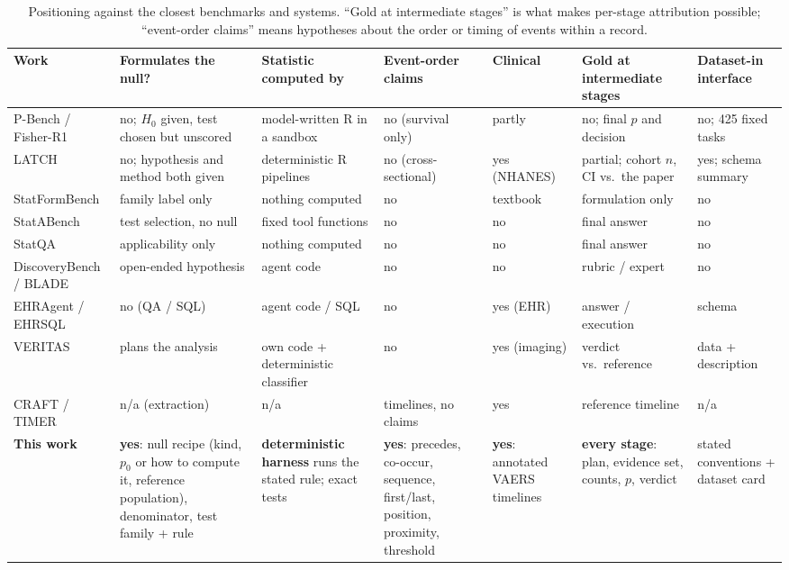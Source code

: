 \begin{table}[t]
\centering
\scriptsize
\setlength{\tabcolsep}{3pt}
\renewcommand{\arraystretch}{1.15}
\begin{tabularx}{\textwidth}{@{}p{2.55cm} Y Y Y Y Y Y@{}}
\toprule
Work & Formulates the null? & Statistic computed by & Event-order claims & Clinical & Gold at intermediate stages & Dataset-in interface \\
\midrule
P-Bench / Fisher-R1 \cite{miao2026fisher} & no; $H_0$ given, test chosen but unscored & model-written R in a sandbox & no (survival only) & partly & no; final $p$ and decision & no; 425 fixed tasks \\
LATCH \cite{gim2026latch} & no; hypothesis and method both given & deterministic R pipelines & no (cross-sectional) & yes (NHANES) & partial; cohort $n$, CI vs.\ the paper & yes; schema summary \\
StatFormBench \cite{wang2026statformbench} & family label only & nothing computed & no & textbook & formulation only & no \\
StatABench \cite{zhu2026statabench} & test selection, no null & fixed tool functions & no & no & final answer & no \\
StatQA \cite{zhu2024statqa} & applicability only & nothing computed & no & no & final answer & no \\
DiscoveryBench / BLADE \cite{majumder2025discoverybench,gu2024blade} & open-ended hypothesis & agent code & no & no & rubric / expert & no \\
EHRAgent / EHRSQL \cite{shi2024ehragent,lee2022ehrsql} & no (QA / SQL) & agent code / SQL & no & yes (EHR) & answer / execution & schema \\
VERITAS \cite{veritas2026} & plans the analysis & own code + deterministic classifier & no & yes (imaging) & verdict vs.\ reference & data + description \\
CRAFT / TIMER \cite{craft2026,timer2025} & n/a (extraction) & n/a & timelines, no claims & yes & reference timeline & n/a \\
\midrule
\textbf{This work} & \textbf{yes}: null recipe (kind, $p_0$ or how to compute it, reference population), denominator, test family + rule & \textbf{deterministic harness} runs the stated rule; exact tests & \textbf{yes}: precedes, co-occur, sequence, first/last, position, proximity, threshold & \textbf{yes}: annotated VAERS timelines & \textbf{every stage}: plan, evidence set, counts, $p$, verdict & stated conventions + dataset card \\
\bottomrule
\end{tabularx}
\caption{Positioning against the closest benchmarks and systems. ``Gold at
intermediate stages'' is what makes per-stage attribution possible;
``event-order claims'' means hypotheses about the order or timing of events
within a record.}
\label{tab:related}
\end{table}

